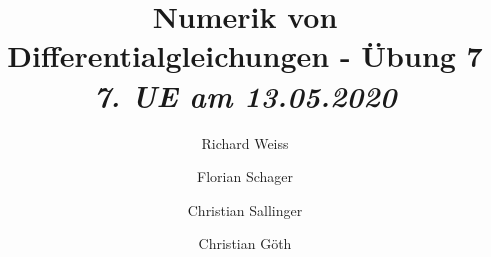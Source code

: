 \documentclass{article}
\title
{
  Numerik von Differentialgleichungen - Übung 7 \\
  \vspace{4pt}
  \normalsize
  \textit{7. UE am 13.05.2020}
}
\author
{
  Richard Weiss       \and
  Florian Schager     \and
  Christian Sallinger \and
  Christian Göth
}
\date{}
\begin{document}
\renewcommand{\figurename}{Abbildung}
\maketitle

%

%
%
%
\end{document}

